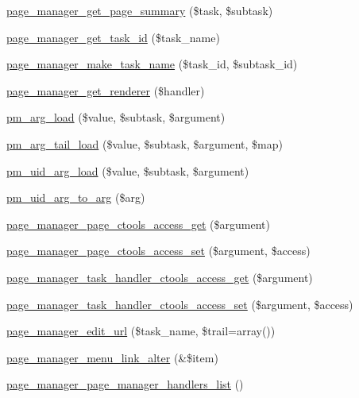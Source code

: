 \begin{DoxyCompactItemize}
\item 
\hyperlink{page__manager_8module_ab0eca887f694137c6e9091bd0fbbf6cb}{page\_\-manager\_\-get\_\-page\_\-summary} (\$task, \$subtask)
\item 
\hyperlink{page__manager_8module_a8c0daf8839fb3d464ee6a8303a5b27d5}{page\_\-manager\_\-get\_\-task\_\-id} (\$task\_\-name)
\item 
\hyperlink{page__manager_8module_a77ee71b3f2d0a5c4228910dc8553efd1}{page\_\-manager\_\-make\_\-task\_\-name} (\$task\_\-id, \$subtask\_\-id)
\item 
\hyperlink{page__manager_8module_a48c0f73f866b9c31d400c04b23b8445e}{page\_\-manager\_\-get\_\-renderer} (\$handler)
\item 
\hyperlink{page__manager_8module_afb6c50228189e10200373039a7a703ee}{pm\_\-arg\_\-load} (\$value, \$subtask, \$argument)
\item 
\hyperlink{page__manager_8module_a247a1c4742c19716ce79077b7c526b00}{pm\_\-arg\_\-tail\_\-load} (\$value, \$subtask, \$argument, \$map)
\item 
\hyperlink{page__manager_8module_a4a9755f49b3bbb286b8643a352eada60}{pm\_\-uid\_\-arg\_\-load} (\$value, \$subtask, \$argument)
\item 
\hyperlink{page__manager_8module_a3f58e1c475005eec131f1648a4bf245e}{pm\_\-uid\_\-arg\_\-to\_\-arg} (\$arg)
\item 
\hyperlink{page__manager_8module_a7485da6795decccb834c9457e7050917}{page\_\-manager\_\-page\_\-ctools\_\-access\_\-get} (\$argument)
\item 
\hyperlink{page__manager_8module_a7e332273ec4049ef62b8f95924f43b47}{page\_\-manager\_\-page\_\-ctools\_\-access\_\-set} (\$argument, \$access)
\item 
\hyperlink{page__manager_8module_ad3ef49901d1e2061c124c1580a70cebf}{page\_\-manager\_\-task\_\-handler\_\-ctools\_\-access\_\-get} (\$argument)
\item 
\hyperlink{page__manager_8module_a53ad57d493d2eaa1358620d1b50d060c}{page\_\-manager\_\-task\_\-handler\_\-ctools\_\-access\_\-set} (\$argument, \$access)
\item 
\hyperlink{page__manager_8module_ab783a148be1cb9606056ed0ccfa24d3a}{page\_\-manager\_\-edit\_\-url} (\$task\_\-name, \$trail=array())
\item 
\hyperlink{page__manager_8module_a75d9dfb39efb8b79e8c5771cb288fb2c}{page\_\-manager\_\-menu\_\-link\_\-alter} (\&\$item)
\item 
\hyperlink{page__manager_8module_a4236c3858e29d7be98ac206003c5b49b}{page\_\-manager\_\-page\_\-manager\_\-handlers\_\-list} ()

\end{DoxyCompactItemize}
